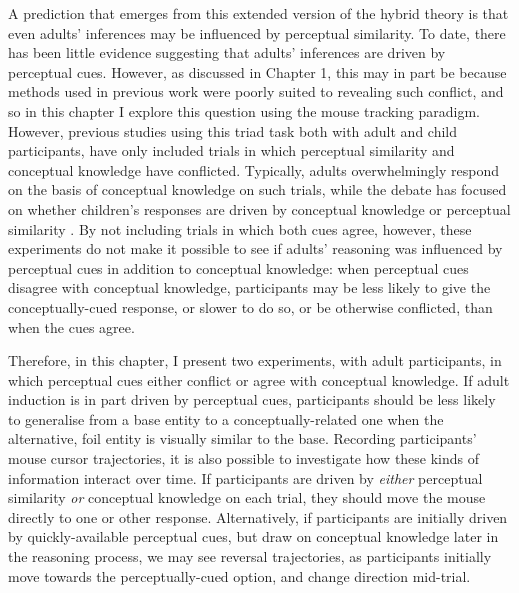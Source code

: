 A prediction that emerges from this extended version of the hybrid theory
is that even adults' inferences may be influenced by perceptual similarity.
To date, there has been little evidence
suggesting that adults' inferences are driven by perceptual cues.
However, as discussed in Chapter 1,
this may in part be because methods used in previous work
were poorly suited to revealing such conflict,
and so in this chapter I explore this question
using the mouse tracking paradigm.
However, previous studies using this triad task
\citep[i.e.][]{Gelman1986,Sloutsky2007,Gelman2013c}
both with adult and child participants,
have only included trials in which perceptual similarity
and conceptual knowledge have conflicted.
Typically, adults overwhelmingly respond on the basis
of conceptual knowledge on such trials,
while the debate has focused on whether children's responses
are driven by conceptual knowledge \citep{Gelman1986,Gelman2013c}
or perceptual similarity \citep{Sloutsky2007}.
By not including trials in which both cues agree, however,
these experiments do not make it possible to see
if adults' reasoning was influenced by perceptual cues
in addition to conceptual knowledge:
when perceptual cues disagree with conceptual knowledge,
participants may be less likely to give the conceptually-cued response,
or slower to do so, or be otherwise conflicted,
than when the cues agree.

Therefore, in this chapter, I present two experiments, with adult participants,
in which perceptual cues either conflict or agree with conceptual knowledge.
If adult induction is in part driven by perceptual cues,
participants should be less likely to generalise
from a base entity to a conceptually-related one
when the alternative, foil entity is visually similar to the base.
Recording participants' mouse cursor trajectories,
it is also possible to investigate how these kinds of information interact over time.
If participants are driven by \emph{either} perceptual similarity
\emph{or} conceptual knowledge on each trial,
they should move the mouse directly to one or other response.
Alternatively, if participants are initially driven by
quickly-available perceptual cues,
but draw on conceptual knowledge later in the reasoning process,
we may see reversal trajectories, as participants
initially move towards the perceptually-cued option,
and change direction mid-trial.


